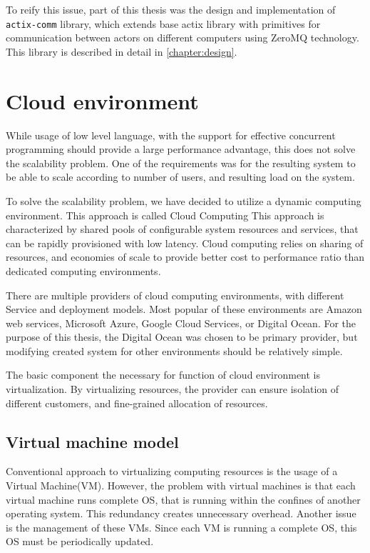To reify this issue, part of this thesis was the design and implementation of \verb|actix-comm| library, which extends
base actix library with primitives for communication between actors on different computers using ZeroMQ technology.
This library is described in detail in \autoref{chapter:design}.

\section{Cloud environment}
While usage of low level language, with the support for effective concurrent programming should provide a large performance
advantage, this does not solve the scalability problem. One of the requirements was for the resulting system to
be able to scale according to number of users, and resulting load on the system.

To solve the scalability problem, we have decided to utilize a dynamic computing environment. This approach is called Cloud Computing\cite{wiki:cloud}
This approach is characterized by shared pools of configurable system resources and services, that can be rapidly provisioned
with low latency. Cloud computing relies on sharing of resources, and economies of scale to provide better
cost to performance ratio than dedicated computing environments.

There are multiple providers of cloud computing environments, with different Service and deployment models.
Most popular of these environments are Amazon web services, Microsoft Azure, Google Cloud Services, or Digital Ocean. For the purpose of
this thesis, the Digital Ocean was chosen to be primary provider, but modifying created system for other
environments should be relatively simple.

The basic component the necessary for function of cloud environment is virtualization. By virtualizing resources,
the provider can ensure isolation of different customers, and fine-grained allocation of resources.

\subsection{Virtual machine model}
Conventional approach to virtualizing computing resources is the usage of a Virtual Machine(VM).
However, the problem with virtual machines is that each virtual machine runs complete OS, that is
running within the confines of another operating system. This redundancy creates unnecessary overhead.
Another issue is the management of these VMs. Since each VM is running a complete OS,
this OS must be periodically updated.


